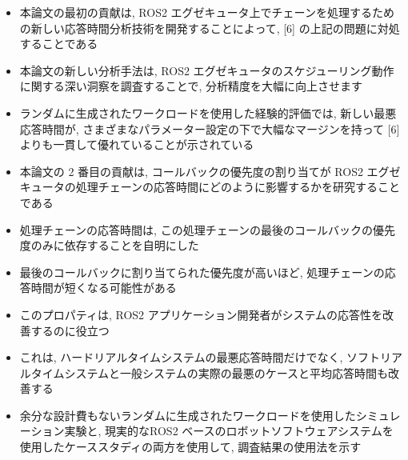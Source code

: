\begin{frame}{}
    \begin{itemize}
        \item 本論文の最初の貢献は, ROS2 エグゼキュータ上でチェーンを処理するための新しい応答時間分析技術を開発することによって, [6] の上記の問題に対処することである
        \item 本論文の新しい分析手法は, ROS2 エグゼキュータのスケジューリング動作に関する深い洞察を調査することで, 分析精度を大幅に向上させます
        \item ランダムに生成されたワークロードを使用した経験的評価では, 新しい最悪応答時間が, さまざまなパラメーター設定の下で大幅なマージンを持って [6] よりも一貫して優れていることが示されている
    \end{itemize}
\end{frame}

\begin{frame}{}
    \begin{itemize}
        \item 本論文の 2 番目の貢献は, コールバックの優先度の割り当てが ROS2 エグゼキュータの処理チェーンの応答時間にどのように影響するかを研究することである
        \item 処理チェーンの応答時間は, この処理チェーンの最後のコールバックの優先度のみに依存することを自明にした
        \item 最後のコールバックに割り当てられた優先度が高いほど, 処理チェーンの応答時間が短くなる可能性がある
        \item このプロパティは, ROS2 アプリケーション開発者がシステムの応答性を改善するのに役立つ
        \item これは, ハードリアルタイムシステムの最悪応答時間だけでなく, ソフトリアルタイムシステムと一般システムの実際の最悪のケースと平均応答時間も改善する
        \item 余分な設計費もないランダムに生成されたワークロードを使用したシミュレーション実験と, 現実的なROS2 ベースのロボットソフトウェアシステムを使用したケーススタディの両方を使用して, 調査結果の使用法を示す
    \end{itemize}
\end{frame}

